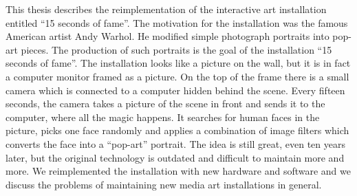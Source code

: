 This thesis describes the reimplementation of the interactive art installation
entitled ``15 seconds of fame''. The motivation for the installation was the
famous American artist Andy Warhol. He modified simple photograph portraits
into pop-art pieces. The production of such portraits is the goal of the
installation ``15 seconds of fame''. The installation looks like a picture on
the wall, but it is in fact a computer monitor framed as a picture. On the top
of the frame there is a small camera which is connected to a computer hidden
behind the scene. Every fifteen seconds, the camera takes a picture of the
scene in front and sends it to the computer, where all the magic happens. It
searches for human faces in the picture, picks one face randomly and applies a
combination of image filters which converts the face into a ``pop-art''
portrait. The idea is still great, even ten years later, but the original
technology is outdated and difficult to maintain more and more. We reimplemented
the installation with new hardware and software and we discuss the problems of
maintaining new media art installations in general.
